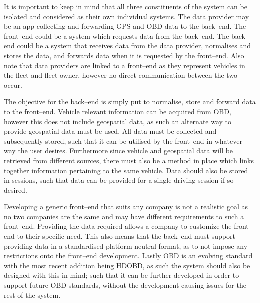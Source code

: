 It is important to keep in mind that all three constituents of the system can be isolated and considered as their own individual systems.
The data provider may be an app collecting and forwarding GPS and \ac{OBD} data to the back--end.
The front--end could be a system which requests data from the back--end.
The back--end could be a system that receives data from the data provider, normalises and stores the data, and forwards data when it is requested by the front--end.
Also note that data providers are linked to a front--end as they represent vehicles in the fleet and fleet owner, however no direct communication between the two occur.

\bigskip
The objective for the back--end is simply put to normalise, store and forward data to the front--end.
Vehicle relevant information can be acquired from \ac{OBD}, however this does not include geospatial data, as such an alternate way to provide geospatial data must be used.
All data must be collected and subsequently stored, such that it can be utilised by the front--end in whatever way the user desires.
Furthermore since vehicle and geospatial data will be retrieved from different sources, there must also be a method in place which links together information pertaining to the same vehicle.
Data should also be stored in sessions, such that data can be provided for a single driving session if so desired.

Developing a generic front--end that suits any company is not a realistic goal as no two companies are the same and may have different requirements to such a front--end.
Providing the data required allows a company to customize the front--end to their specific need.
This also means that the back--end must support providing data in a standardised platform neutral format, as to not impose any restrictions onto the front--end development.
Lastly \ac{OBD} is an evolving standard with the most recent addition being \ac{HDOBD}, as such the system should also be designed with this in mind; such that it can be further developed in order to support future \ac{OBD} standards, without the development causing issues for the rest of the system.

